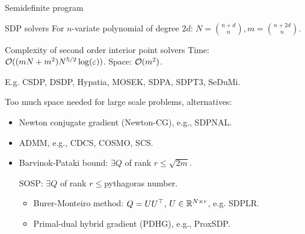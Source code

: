 \begin{frame}{Semidefinite program}
\end{frame}

\begin{frame}{SDP solvers}
  For $n$-variate polynomial of degree $2d$:
  $N = {n + d \choose n}, m = {n + 2d \choose n}$.
  \begin{block}{Complexity of second order interior point solvers}
    Time:
    $\mathcal{O}((mN + m^2)N^{5/2}\log(\varepsilon))$.
    Space:
    $\mathcal{O}(m^2)$.

    E.g. CSDP, DSDP, Hypatia, MOSEK, SDPA, SDPT3, SeDuMi.
  \end{block}
  Too much space needed for large scale problems, alternatives:
  \begin{itemize}
    \item
    Newton conjugate gradient (Newton-CG), e.g., SDPNAL.
    \item
    ADMM, e.g., CDCS, COSMO, SCS.
    \item
    Barvinok-Pataki bound: $\exists Q$ of rank $r \le \sqrt{2m}$.

    SOSP: $\exists Q$ of rank $r \le {}$pythagoras number.
  \begin{itemize}
    \item
    Burer-Monteiro method: $Q = UU^\top$, $U \in \mathbb{R}^{N \times r}$, e.g. SDPLR.
    \item
    Primal-dual hybrid gradient (PDHG), e.g., ProxSDP.
  \end{itemize}
  \end{itemize}
\end{frame}

